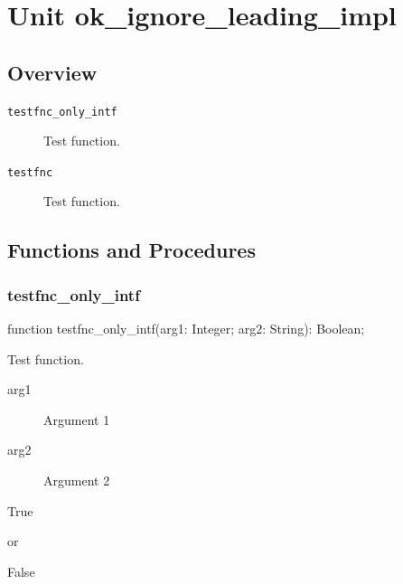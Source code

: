 \documentclass{report}
\begin{document}
\newlength{\tmplength}
\chapter{Unit ok{\_}ignore{\_}leading{\_}impl}
\section{Overview}
\begin{description}
\item[\texttt{testfnc{\_}only{\_}intf}]Test function.
\item[\texttt{testfnc}]Test function.
\end{description}
\section{Functions and Procedures}
\subsection*{testfnc{\_}only{\_}intf}
\begin{list}{}{
\setlength{\itemindent}{0cm}
\setlength{\listparindent}{0cm}
\setlength{\leftmargin}{\evensidemargin}
\addtolength{\leftmargin}{\tmplength}
\settowidth{\labelsep}{X}
\addtolength{\leftmargin}{\labelsep}
\setlength{\labelwidth}{\tmplength}
}
\begin{flushleft}
\item[\textbf{Declaration}\hfill]
\begin{ttfamily}
function testfnc{\_}only{\_}intf(arg1: Integer; arg2: String): Boolean;\end{ttfamily}


\end{flushleft}
\par
\item[\textbf{Description}]
Test function.

  \par
\item[\textbf{Parameters}]
\begin{description}
\item[arg1] Argument 1
\item[arg2] Argument 2
\end{description}
\item[\textbf{Returns}]\begin{ttfamily}True\end{ttfamily} or \begin{ttfamily}False\end{ttfamily}


\end{list}
\end{document}

